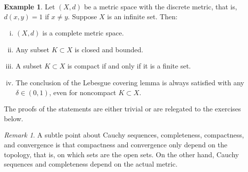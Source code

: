 \documentclass[12pt,openany]{book}
\theoremstyle{plain}
\theoremstyle{remark}
\newtheorem{remark}[thm]{Remark}
\theoremstyle{definition}
\theoremstyle{exercise}
\theoremstyle{example}
\newtheorem{example}[thm]{Example}
\begin{document}
\begin{example}
Let $(X,d)$ be a metric space with the discrete metric, that is, $d(x,y) = 1$
if $x \not= y$.  Suppose
$X$ is an infinite set.  Then:
\begin{enumerate}[(i)]
\item $(X,d)$ is a complete metric space.
\item Any subset $K \subset X$ is closed and bounded.
\item A subset $K \subset X$ is compact if and only if it is a finite set.
\item The conclusion of the Lebesgue covering lemma is always satisfied
with any $\delta \in (0,1)$, even for noncompact $K \subset X$.
\end{enumerate}
The proofs
of the statements are either trivial or are relegated to the exercises
below.
\end{example}

\begin{remark}
A subtle point about Cauchy sequences, completeness, compactness,
and convergence is that compactness and convergence only depend on the
topology, that is, on which sets are the open sets.  On the other hand,
Cauchy sequences and completeness depend on the actual metric.
\end{remark}
\end{document}
